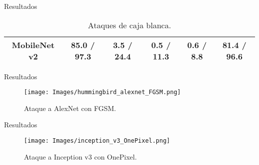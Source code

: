 \documentclass[10pt]{beamer}
\begin{document}
\begin{frame}{Resultados}
\begin{table}[H]
{\begin{tabular}{@{}cccccc@{}}
MobileNet v2    & 85.0 / 97.3                                                              & 3.5 / 24.4                                                             & 0.5 / 11.3                                                            & 0.6 / 8.8                                                                & 81.4 / 96.6                                                                \\ \bottomrule
\end{tabular}%
}
\caption{Ataques de caja blanca.}
\end{table}

\end{frame}

\begin{frame}{Resultados}
\justify	
\small

\begin{figure}[H]
\centering
\texttt{[image: Images/hummingbird\_alexnet\_FGSM.png]}
\caption{Ataque a AlexNet con FGSM.}
\end{figure}

\end{frame}

\begin{frame}{Resultados}
\justify	
\small

\begin{figure}[H]
\centering
\texttt{[image: Images/inception\_v3\_OnePixel.png]}
\caption{Ataque a Inception v3 con OnePixel.}
\end{figure}

\end{frame}
\end{document}
